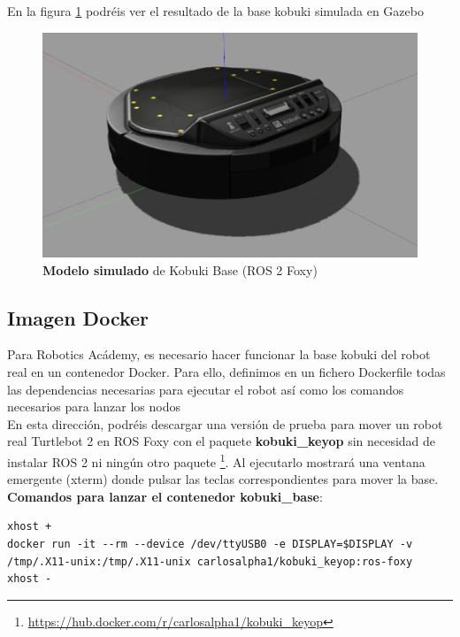 En la figura \ref{fig:sim_kobuki_base} podréis ver el resultado de la base kobuki simulada en Gazebo
\begin{figure} [H]
  \begin{center}
    \includegraphics[width=15cm]{imagenes/sim_kobuki_base.png}
  \end{center}
  \caption[\textbf{Modelo simulado} de Kobuki Base (ROS 2 Foxy)]{\textbf{Modelo simulado} de Kobuki Base (ROS 2 Foxy)}
  \label{fig:sim_kobuki_base}
\end{figure}




\subsection{Imagen Docker}
\label{sec:kobuki_base_docker}

Para Robotics Acádemy, es necesario hacer funcionar la base kobuki del robot real en un contenedor Docker. Para ello, definimos en un fichero Dockerfile todas las dependencias necesarias para ejecutar el robot así como los comandos necesarios para lanzar los nodos\\

En esta dirección, podréis descargar una versión de prueba para mover un robot real Turtlebot 2 en ROS Foxy con el paquete \textbf{kobuki\_keyop} sin necesidad de instalar ROS 2 ni ningún otro paquete \footnote{\url{https://hub.docker.com/r/carlosalpha1/kobuki_keyop}}. Al ejecutarlo mostrará una ventana emergente (xterm) donde pulsar las teclas correspondientes para mover la base.\\

\textbf{Comandos para lanzar el contenedor kobuki\_base}:\\
\begin{lstlisting}
xhost +
docker run -it --rm --device /dev/ttyUSB0 -e DISPLAY=$DISPLAY -v /tmp/.X11-unix:/tmp/.X11-unix carlosalpha1/kobuki_keyop:ros-foxy
xhost -
\end{lstlisting}


